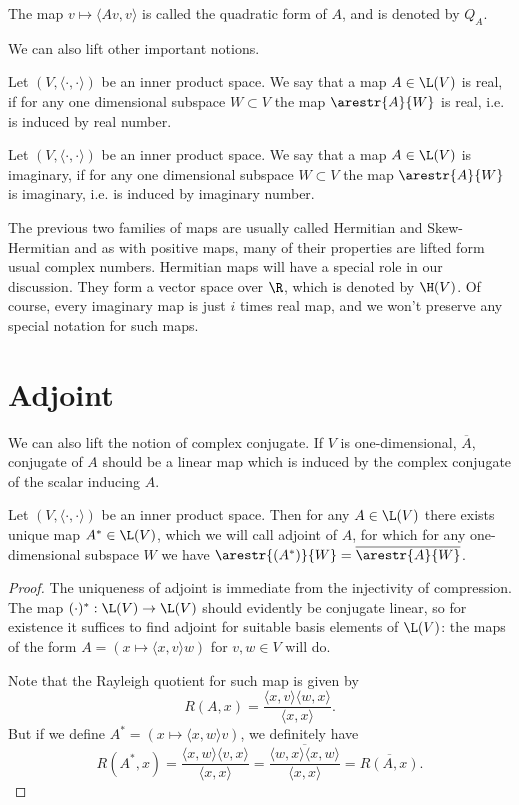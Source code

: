 The map $v \mapsto \langle A v, v \rangle$ is called the quadratic form of $A$, and is denoted by $Q_{A}$.

We can also lift other important notions.

\begin{maar}
	Let $(V, \langle \cdot, \cdot \rangle)$ be an inner product space. We say that a map $A \in \L(V)$ is real, if for any one dimensional subspace $W \subset V$ the map $\arestr{A}{W}$ is real, i.e. is induced by real number.
\end{maar}

\begin{maar}
	Let $(V, \langle \cdot, \cdot \rangle)$ be an inner product space. We say that a map $A \in \L(V)$ is imaginary, if for any one dimensional subspace $W \subset V$ the map $\arestr{A}{W}$ is imaginary, i.e. is induced by imaginary number.
\end{maar}

The previous two families of maps are usually called Hermitian and Skew-Hermitian and as with positive maps, many of their properties are lifted form usual complex numbers. Hermitian maps will have a special role in our discussion. They form a vector space over $\R$, which is denoted by $\H(V)$. Of course, every imaginary map is just $i$ times real map, and we won't preserve any special notation for such maps.

\section{Adjoint}

We can also lift the notion of complex conjugate. If $V$ is one-dimensional, $\overline{A}$, conjugate of $A$ should be a linear map which is induced by the complex conjugate of the scalar inducing $A$.

\begin{lause}
	Let $(V, \langle \cdot, \cdot \rangle)$ be an inner product space. Then for any $A \in \L(V)$ there exists unique map $A^{*} \in \L(V)$, which we will call adjoint of $A$, for which for any one-dimensional subspace $W$ we have $\arestr{(A^{*})}{W} = \overline{\arestr{A}{W}}$.
\end{lause}
\begin{proof}
	The uniqueness of adjoint is immediate from the injectivity of compression. The map $(\cdot)^{*} : \L(V) \to \L(V)$ should evidently be conjugate linear, so for existence it suffices to find adjoint for suitable basis elements of $\L(V)$: the maps of the form $A = (x \mapsto \langle x, v \rangle w)$ for $v, w \in V$ will do.

	Note that the Rayleigh quotient for such map is given by
	\[
		R(A, x) = \frac{\langle x, v \rangle \langle w, x \rangle}{\langle x, x \rangle}.
	\]
	But if we define $A^{*} = (x \mapsto \langle x, w \rangle v)$, we definitely have
	\[
		R(A^{*}, x) = \frac{\langle x, w \rangle \langle v, x \rangle}{\langle x, x \rangle} = \overline{\frac{\langle w, x \rangle \langle x, w \rangle}{\langle x, x \rangle}} = \overline{R(A, x)}.
	\]
\end{proof}

